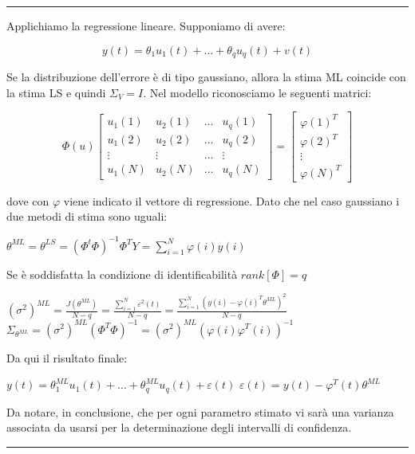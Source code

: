 \begin{center} \rule{300pt}{1pt} \end{center}
\begin{esempio}
Applichiamo la regressione lineare. Supponiamo di avere:

  \[ y(t)=\theta_1u_1(t)+ \dots +\theta_qu_q(t)+v(t) \]

Se la distribuzione dell'errore è di tipo gaussiano, allora la stima ML coincide con la stima LS e quindi $\Sigma_V=I$. Nel modello riconosciamo le seguenti matrici:

  \[ \Phi(u)\begin{bmatrix} u_1(1) & u_2(1) & \dots & u_q(1) \\ u_1(2) & u_2(2) & \dots & u_q(2)\\ \vdots & \vdots & \dots & \vdots \\ u_1(N) & u_2(N) & \dots & u_q(N) \end{bmatrix}=\begin{bmatrix} \varphi(1)^T \\  \varphi(2)^T \\ \vdots \\ \varphi(N)^T \end{bmatrix} \]

dove con $\varphi$ viene indicato il vettore di regressione. Dato che nel caso gaussiano i due metodi di stima sono uguali:
\begin{center}
  $\theta^{ML}=\theta^{LS}=(\Phi^t\Phi)^{-1}\Phi^TY=\sum_{i=1}^{N} \varphi(i) y(i)$
\end{center}
Se è soddisfatta la condizione di identificabilità $rank[\Phi]=q$
\begin{center}
  $(\sigma^2)^{ML}=\frac{J(\theta^{ML})}{N-q}=\frac{\sum_{i=1}^{N} \varepsilon^2(t) }{N-q}=\frac{\sum_{i=1}^{N} {\left(y(i)-\varphi(i)^T\theta^{ML}\right)^2}}{N-q}$\newline
  $\Sigma_{\theta^{ML}}=(\sigma^2)^{ML}(\Phi^T\Phi)^{-1}=(\sigma^2)^{ML} { (\varphi(i) \varphi^T(i) )^{-1}}$
\end{center}
Da qui il risultato finale:
\begin{center}
  $y(t)=\theta_1^{ML}u_1(t)+ \dots +\theta^{ML}_qu_q(t)+\varepsilon (t)$\newline
  $\varepsilon (t)=y(t)-\varphi^T(t)\theta^{ML}$
\end{center}
Da notare, in conclusione, che per ogni parametro stimato vi sarà una varianza associata da usarsi per la determinazione degli intervalli di confidenza.
\end{esempio}
\begin{center} \rule{300pt}{1pt} \end{center}
